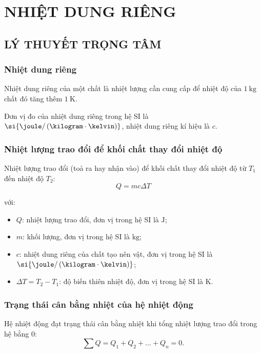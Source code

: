 \section{NHIỆT DUNG RIÊNG}
\subsection{LÝ THUYẾT TRỌNG TÂM}
\begin{tomtat}
	\subsubsection{Nhiệt dung riêng}
	\begin{dn}
		Nhiệt dung riêng của một chất là nhiệt lượng cần cung cấp để nhiệt độ của $\SI{1}{\kilogram}$ chất đó tăng thêm $\SI{1}{\kelvin}$.
	\end{dn}
	Đơn vị đo của nhiệt dung riêng trong hệ SI là $\si{\joule/\left(\kilogram\cdot\kelvin\right)}$, nhiệt dung riêng kí hiệu là $c$.
	\subsubsection{Nhiệt lượng trao đổi để khối chất thay đổi nhiệt độ}
	\begin{boxdn}
		Nhiệt lượng trao đổi (toả ra hay nhận vào) để khối chất thay đổi nhiệt độ từ $T_1$ đến nhiệt độ $T_2$:
		$$Q=mc\Delta T$$
	\end{boxdn}
	với:
	\begin{itemize}
		\item $Q$: nhiệt lượng trao đổi, đơn vị trong hệ SI là $\si{\joule}$;
		\item $m$: khối lượng, đơn vị trong hệ SI là $\si{\kilogram}$;
		\item $c$: nhiệt dung riêng của chất tạo nên vật, đơn vị trong hệ SI là $\si{\joule/\left(\kilogram\cdot\kelvin\right)}$;
		\item $\Delta T=T_2-T_1$: độ biến thiên nhiệt độ, đơn vị trong hệ SI là $\si{\kelvin}$.
	\end{itemize}
	\subsubsection{Trạng thái cân bằng nhiệt của hệ nhiệt động}
	\begin{boxdn}
		Hệ nhiệt động đạt trạng thái cân bằng nhiệt khi tổng nhiệt lượng trao đổi trong hệ bằng 0:
		$$\sum Q=Q_1+Q_2+\dots+Q_n=0.$$
	\end{boxdn}
\end{tomtat}
